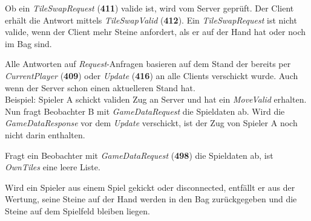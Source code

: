 \documentclass[a4paper, 10pt]{article}
\begin{document}
Ob ein \textit{TileSwapRequest} (\textbf{411}) valide ist, wird vom Server geprüft. Der Client erhält die Antwort mittels \textit{TileSwapValid} (\textbf{412}). Ein \textit{TileSwapRequest} ist nicht valide, wenn der Client mehr Steine anfordert, als er auf der Hand hat oder noch im Bag sind.\par
Alle Antworten auf \textit{Request}-Anfragen basieren auf dem Stand der bereits per \textit{CurrentPlayer} (\textbf{409}) oder \textit{Update} (\textbf{416}) an alle Clients verschickt wurde. Auch wenn der Server schon einen aktuelleren Stand hat.\\
Beispiel: Spieler A schickt validen Zug an Server und hat ein \textit{MoveValid} erhalten. Nun fragt Beobachter B mit \textit{GameDataRequest} die Spieldaten ab. Wird die \textit{GameDataResponse} vor dem \textit{Update} verschickt, ist der Zug von Spieler A noch nicht darin enthalten.\par
Fragt ein Beobachter mit \textit{GameDataRequest} (\textbf{498}) die Spieldaten ab, ist \textit{OwnTiles} eine leere Liste.\par
Wird ein Spieler aus einem Spiel gekickt oder disconnected, entfällt er aus der Wertung, seine Steine auf der Hand werden in den Bag zurückgegeben und die Steine auf dem Spielfeld bleiben liegen.\par
\end{document}
